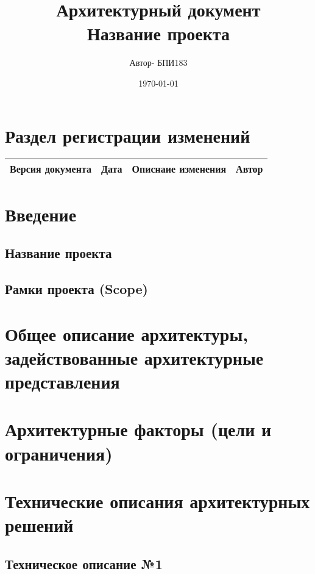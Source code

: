 \documentclass[a4paper,18pt]{article} %
\title{\textbf{\Huge Архитектурный документ} \\ {\Large Название проекта}}
\author{Автор- БПИ183}
\date{\today}
\begin{document}
\maketitle
\newpage

\section{\textbf{Раздел регистрации изменений}}

\begin{table}[h]
    \flushleft
    \begin{tabular}{|c|c|c|c|}
        \hline
        \textbf{Версия документа} & \textbf{Дата} & \textbf{Описнаие изменения} & \textbf{Автор} \\
        \hline
    \end{tabular}
\end{table}

\newpage
\section{\textbf{Введение}}

\subsection{\textbf{Название проекта}}

\subsection{\textbf{Рамки проекта (Scope)}}

\section{\textbf{Общее описание архитектуры, задействованные архитектурные представления}}

\section{\textbf{Архитектурные факторы (цели и ограничения)}}


\newpage
\section{\textbf{Технические описания архитектурных решений}}

\subsection{\textbf{Техническое описание №1}}
\end{document}
